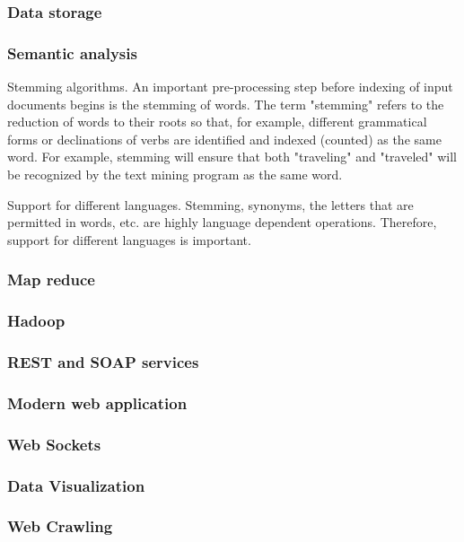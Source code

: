 \subsubsection{Data storage}

\subsubsection{Semantic analysis}
Stemming algorithms. An important pre-processing step before indexing of input documents begins is the stemming of words. The term "stemming" refers to the reduction of words to their roots so that, for example, different grammatical forms or declinations of verbs are identified and indexed (counted) as the same word. For example, stemming will ensure that both "traveling" and "traveled" will be recognized by the text mining program as the same word.

Support for different languages. Stemming, synonyms, the letters that are permitted in words, etc. are highly language dependent operations. Therefore, support for different languages is important.
\subsubsection{Map reduce}
\subsubsection{Hadoop}
\subsubsection{REST and SOAP services}
\subsubsection{Modern web application}
\subsubsection{Web Sockets}
\subsubsection{Data Visualization}
\subsubsection{Web Crawling}

